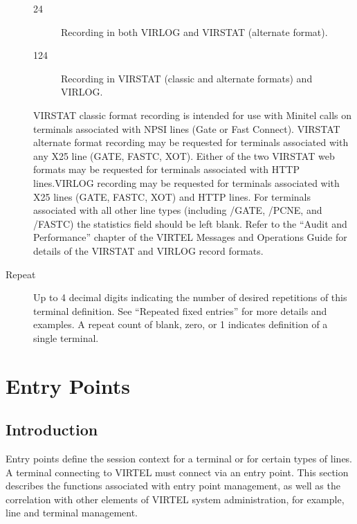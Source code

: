 \documentclass[letterpaper,10pt,english]{sphinxmanual}
\begin{document}
\begin{description}
\begin{description}
\item[{24}] \leavevmode
Recording in both VIRLOG and VIRSTAT (alternate format).

\item[{124}] \leavevmode
Recording in VIRSTAT (classic and alternate formats) and VIRLOG.

\end{description}

VIRSTAT classic format recording is intended for use with Minitel calls on terminals associated with NPSI lines (Gate or Fast Connect). VIRSTAT alternate format recording may be requested for terminals associated with any X25 line (GATE, FASTC, XOT). Either of the two VIRSTAT web formats may be requested for terminals associated with HTTP lines.VIRLOG recording may be requested for terminals associated with X25 lines (GATE, FASTC, XOT) and HTTP lines. For terminals associated with all other line types (including /GATE, /PCNE, and /FASTC) the statistics field should be left blank. Refer to the “Audit and Performance” chapter of the VIRTEL Messages and Operations Guide for details of the VIRSTAT and VIRLOG record formats.

\item[{Repeat}] \leavevmode
Up to 4 decimal digits indicating the number of desired repetitions of this terminal definition. See “Repeated fixed entries” for more details and examples.
A repeat count of blank, zero, or 1 indicates definition of a single terminal.

\end{description}


\chapter{Entry Points}
\label{\detokenize{connectivity_guide:index-102}}\label{\detokenize{connectivity_guide:entry-points}}

\section{Introduction}
\label{\detokenize{connectivity_guide:id54}}
Entry points define the session context for a terminal or for certain types of lines. A terminal connecting to VIRTEL must connect via an entry point. This section describes the functions associated with entry point management, as well as the correlation with other elements of VIRTEL system administration, for example, line and terminal management.
\end{document}
